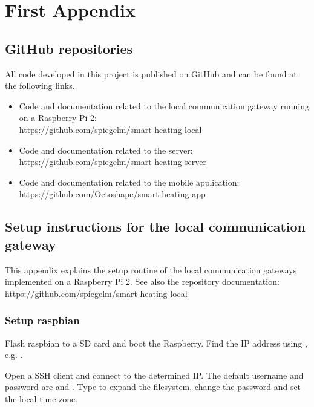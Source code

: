 
\chapter{First Appendix}
\label{sec:first_appendix}

\section{GitHub repositories}

All code developed in this project is published on GitHub and can be found at the following links.

\begin{itemize}
	\item{Code and documentation related to the local communication gateway running on a Raspberry Pi 2:\\ \url{https://github.com/spiegelm/smart-heating-local}}
	
	\item{Code and documentation related to the server:\\ \url{https://github.com/spiegelm/smart-heating-server}}
	
	\item{Code and documentation related to the mobile application:\\ \url{https://github.com/Octoshape/smart-heating-app}}
\end{itemize}

\section{Setup instructions for the local communication gateway}

This appendix explains the setup routine of the local communication gateways implemented on a Raspberry Pi 2.
See also the repository documentation:\\
\url{https://github.com/spiegelm/smart-heating-local}

\subsection{Setup raspbian}\label{setup-raspbian}

Flash raspbian to a SD card and boot the Raspberry. Find the IP address
using , e.g.
.

Open a SSH client and connect to the determined IP. The default username
and password are  and . Type
 to expand the filesystem, change the
password and set the local time zone.

